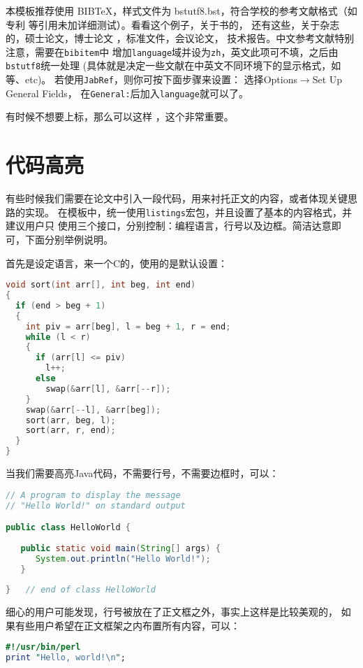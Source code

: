 {本模板推荐使用 BIB\TeX，样式文件为 bstutf8.bst，符合学校的参考文献格式（如专利
等引用未加详细测试）。看看这个例子，关于书的，
还有这些，关于杂志的，硕士论文，博士论文
，标准文件，会议论文，%
技术报告。中文参考文献\textsf{特别注意}，需要在\verb|bibitem|中
增加\verb|language|域并设为\verb|zh|，英文此项可不填，之后由\verb|bstutf8|统一处理
(具体就是决定一些文献在中英文不同环境下的显示格式，如等、etc)。
若使用\verb|JabRef|，则你可按下面步骤来设置：
选择\textsf{Options}$\rightarrow$\textsf{Set Up General Fields}，
在\verb|General:|后加入\verb|language|就可以了。

有时候不想要上标，那么可以这样 \cite{shaheshang}，这个非常重要。

\section{代码高亮}
有些时候我们需要在论文中引入一段代码，用来衬托正文的内容，或者体现关键思路的实现。
在模板中，统一使用\texttt{listings}宏包，并且设置了基本的内容格式，并建议用户只
使用三个接口，分别控制：编程语言，行号以及边框。简洁达意即可，下面分别举例说明。

首先是设定语言，来一个C的，使用的是默认设置：
\begin{lstlisting}[language=C]
void sort(int arr[], int beg, int end)
{
  if (end > beg + 1)
  {
    int piv = arr[beg], l = beg + 1, r = end;
    while (l < r)
    {
      if (arr[l] <= piv)
        l++;
      else
        swap(&arr[l], &arr[--r]);
    }
    swap(&arr[--l], &arr[beg]);
    sort(arr, beg, l);
    sort(arr, r, end);
  }
}
\end{lstlisting}

当我们需要高亮Java代码，不需要行号，不需要边框时，可以：
\begin{lstlisting}[language=Java,numbers=none,frame=none]
// A program to display the message
// "Hello World!" on standard output

public class HelloWorld {
 
   public static void main(String[] args) {
      System.out.println("Hello World!");
   }
      
}   // end of class HelloWorld
\end{lstlisting}

细心的用户可能发现，行号被放在了正文框之外，事实上这样是比较美观的，
如果有些用户希望在正文框架之内布置所有内容，可以：
\begin{lstlisting}[language=perl,xleftmargin=2em,framexleftmargin=1.5em]
#!/usr/bin/perl
print "Hello, world!\n";
\end{lstlisting}

}
